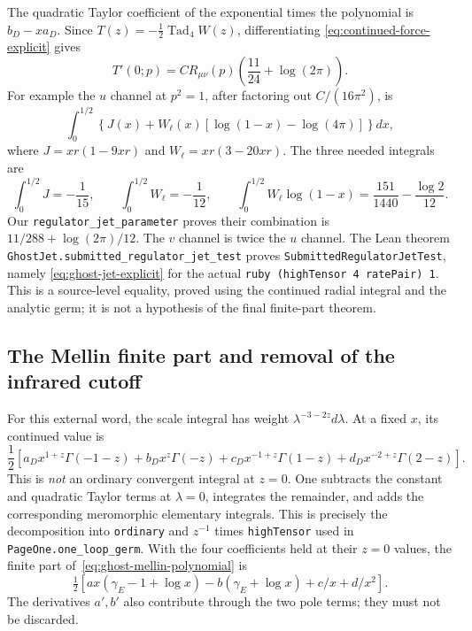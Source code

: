 \documentclass[11pt]{article}
\newcommand{\code}[1]{{\small\nolinkurl{#1}}}
\begin{document}
The quadratic Taylor coefficient of the exponential times the
polynomial is $b_D-xa_D$. Since
$T(z)=-\tfrac12\operatorname{Tad}_4W(z)$, differentiating
\eqref{eq:continued-force-explicit} gives
\begin{equation}\label{eq:ghost-jet-explicit}
 T'(0;p)=C R_{\mu\nu}(p)
                 \left(\frac{11}{24}+\log(2\pi)\right).
\end{equation}
For example the $u$ channel at $p^2=1$, after factoring out
$C/(16\pi^2)$, is
\[
 \int_0^{1/2}\!\left\{J(x)+W_\ell(x)
                 [\log(1-x)-\log(4\pi)]\right\}dx,
\]
where $J=xr(1-9xr)$ and $W_\ell=xr(3-20xr)$.
The three needed integrals are
\[
 \int_0^{1/2}J=-\frac1{15},\qquad
 \int_0^{1/2}W_\ell=-\frac1{12},\qquad
 \int_0^{1/2}W_\ell\log(1-x)
                  =\frac{151}{1440}-\frac{\log2}{12}.
\]
Our \code{regulator_jet_parameter} proves their combination is
$11/288+\log(2\pi)/12$. The $v$ channel is twice the $u$ channel.
The Lean theorem \code{GhostJet.submitted_regulator_jet_test}
proves \code{SubmittedRegulatorJetTest}, namely
\eqref{eq:ghost-jet-explicit} for the actual
\code{ruby (highTensor 4 ratePair) 1}. This is a source-level equality,
proved using the continued radial integral and the analytic germ;
it is not a hypothesis of the final finite-part theorem.

\subsection{The Mellin finite part and removal of the infrared cutoff}

For this external word, the scale integral has weight
$\lambda^{-3-2z}d\lambda$. At a fixed $x$, its continued value is
\begin{equation}\label{eq:ghost-mellin-polynomial}
 \frac12\left[
 a_Dx^{1+z}\Gamma(-1-z)+b_Dx^z\Gamma(-z)
 +c_Dx^{-1+z}\Gamma(1-z)+d_Dx^{-2+z}\Gamma(2-z)\right].
\end{equation}
This is \emph{not} an ordinary convergent integral at $z=0$.
One subtracts the constant and quadratic Taylor terms at
$\lambda=0$, integrates the remainder, and adds the corresponding
meromorphic elementary integrals. This is precisely the decomposition
into \code{ordinary} and $z^{-1}$ times \code{highTensor} used in
\code{PageOne.one_loop_germ}.
With the four coefficients held at their $z=0$ values, the finite
part of~\eqref{eq:ghost-mellin-polynomial} is
\[
 \tfrac12\left[
 ax(\gamma_E-1+\log x)-b(\gamma_E+\log x)+c/x+d/x^2\right].
\]
The derivatives $a',b'$ also contribute through the two pole terms;
they must not be discarded.
\end{document}
